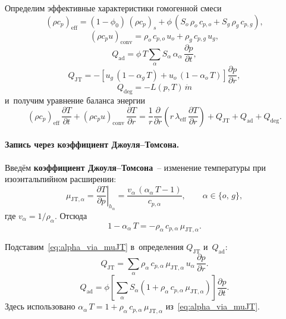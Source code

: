 \documentclass[12pt,a4paper]{article}
\newcommand{\divr}[1]{\frac{1}{r}\frac{\partial}{\partial r}\!\left(r\,#1\right)}
\newcommand{\pdt}[1]{\frac{\partial #1}{\partial t}}
\newcommand{\pdr}[1]{\frac{\partial #1}{\partial r}}
\newcommand{\mdot}{\dot{m}}
\newcommand{\rhocpeff}{(\rho c_p)_{\mathrm{eff}}}
\newcommand{\rhocpconv}{(\rho c_p u)_{\mathrm{conv}}}
\newcommand{\leff}{\lambda_{\mathrm{eff}}}
\newcommand{\QJT}{Q_{\mathrm{JT}}}
\newcommand{\Qad}{Q_{\mathrm{ad}}}
\newcommand{\Qdeg}{Q_{\mathrm{deg}}}
\begin{document}
Определим эффективные характеристики гомогенной смеси
\begin{equation}
\rhocpeff
    = (1-\phi_0)\,(\rho c_p)_s
      + \phi\,(S_o\,\rho_o\,c_{p,o} + S_g\,\rho_g\,c_{p,g}),
\end{equation}
\begin{equation}
\rhocpconv
    = \rho_o\,c_{p,o}\,u_o + \rho_g\,c_{p,g}\,u_g,
\end{equation}
\begin{equation}
\Qad = \phi\,T\sum_\alpha S_\alpha\,\alpha_\alpha\,\pdt{p},
\end{equation}
\begin{equation}
\QJT = -\left[u_g\,(1 - \alpha_g\,T) + u_o\,(1 - \alpha_o\,T)\right]\pdr{p},
\end{equation}
\begin{equation}
\Qdeg = - L(p,T)\,\mdot
\end{equation}
и~получим уравнение баланса энергии
\begin{equation}\label{eq:energy_final}
  \boxed{
    \rhocpeff\,\pdt{T}
    + \rhocpconv\,\pdr{T}
    = \divr{\leff\,\pdr{T}}
    + \QJT + \Qad + \Qdeg.
  }
\end{equation}

\paragraph{Запись через коэффициент Джоуля--Томсона.}

Введём \textbf{коэффициент Джоуля--Томсона}~-- изменение
температуры при изоэнтальпийном расширении:
\begin{equation}\label{eq:muJT_def}
  \mu_{\mathrm{JT},\alpha}
  = \left.\frac{\partial T}{\partial p}\right|_{h_\alpha}
  = \frac{v_\alpha\,(\alpha_\alpha\,T - 1)}{c_{p,\alpha}},
  \qquad \alpha \in \{o,\,g\},
\end{equation}
где $v_\alpha = 1/\rho_\alpha$. Отсюда
\begin{equation}\label{eq:alpha_via_muJT}
  1 - \alpha_\alpha\,T
  = -\rho_\alpha\,c_{p,\alpha}\,\mu_{\mathrm{JT},\alpha}.
\end{equation}

Подставим~\eqref{eq:alpha_via_muJT} в~определения
$\QJT$ и~$\Qad$:
\begin{equation}\label{eq:QJT_muJT}
  \boxed{
    \QJT
    = \sum_\alpha \rho_\alpha\,c_{p,\alpha}\,
      \mu_{\mathrm{JT},\alpha}\,u_\alpha\,\pdr{p}.
  }
\end{equation}
\begin{equation}\label{eq:Qad_muJT}
  \boxed{
    \Qad
    = \phi\!\left[
      \sum_\alpha S_\alpha\!\left(1
        + \rho_\alpha\,c_{p,\alpha}\,\mu_{\mathrm{JT},\alpha}\right)
    \right]\pdt{p}.
  }
\end{equation}
Здесь использовано $\alpha_\alpha\,T
= 1 + \rho_\alpha\,c_{p,\alpha}\,\mu_{\mathrm{JT},\alpha}$
из~\eqref{eq:alpha_via_muJT}.
\end{document}
